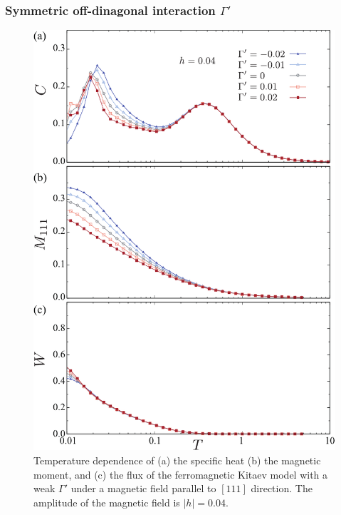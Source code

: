 \documentclass[reprint,amsmath,amssymb,aps,prx]{revtex4-2}
\begin{document}
   \subsubsection{Symmetric off-dinagonal interaction $\Gamma'$}
\begin{figure}
  \begin{center}
    \includegraphics[width=0.9\linewidth]{plot_CMF_h0.04_Gp.pdf}
  \end{center}
  \caption{Temperature dependence of (a) the specific heat (b) the magnetic moment, and (c) the flux of the ferromagnetic Kitaev model with a weak $\Gamma'$ under a magnetic field parallel to $[111]$ direction. The amplitude of the magnetic field is $|h|=0.04$.}
  \label{fig:CMF_h0.04_Gp}
\end{figure}
\end{document}
